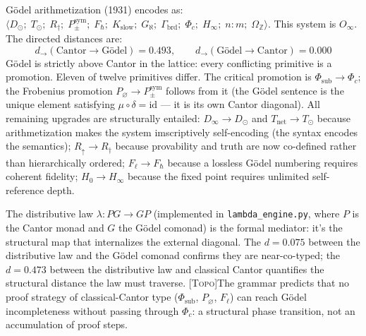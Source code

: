 \documentclass[12pt,a4paper]{article}
\newcommand{\Phic}{\Phi_c}
\newcommand{\Ppms}{P_{\pm}^{\text{sym}}}
\newcommand{\Oinf}{O_\infty}
\newcommand{\OmegaZ}{\Omega_{\mathbb{Z}}}
\newcommand{\TOPO}{\textsc{[Topo]}}
\begin{document}
G\"{o}del arithmetization (1931) encodes as:
$\langle D_\odot;\; T_\odot;\; R_\dagger;\; \Ppms;\; F_\hbar;\;
K_\text{slow};\; G_\aleph;\; \Gamma_\text{brd};\; \Phic;\; H_\infty;\; n{:}m;\;
\OmegaZ \rangle$.
This system is $\Oinf$. The directed distances are:
\begin{equation}
  d_\to(\text{Cantor} \to \text{G\"{o}del}) = 0.493, \qquad
  d_\to(\text{G\"{o}del} \to \text{Cantor}) = 0.000
  \label{eq:cantor_godel_dist}
\end{equation}
G\"{o}del is strictly above Cantor in the lattice: every conflicting
primitive is a promotion. Eleven of twelve primitives differ. The
critical promotion is $\Phi_\text{sub} \to \Phic$; the Frobenius
promotion $P_\varnothing \to \Ppms$ follows from it (the G\"{o}del
sentence is the unique element satisfying $\mu \circ \delta = \text{id}$
--- it is its own Cantor diagonal). All remaining upgrades are
structurally entailed: $D_\infty \to D_\odot$ and $T_\text{net} \to T_\odot$
because arithmetization makes the system imscriptively self-encoding
(the syntax encodes the semantics); $R_\uparrow \to R_\dagger$ because
provability and truth are now co-defined rather than hierarchically ordered;
$F_\ell \to F_\hbar$ because a lossless G\"{o}del numbering requires
coherent fidelity; $H_0 \to H_\infty$ because the fixed point requires
unlimited self-reference depth.

The distributive law $\lambda: PG \to GP$ (implemented in
\texttt{lambda\_engine.py}, where $P$ is the Cantor monad and $G$ the
G\"{o}del comonad) is the formal mediator: it's the structural map
that internalizes the external diagonal. The $d = 0.075$ between the
distributive law and the G\"{o}del comonad confirms they are
near-co-typed; the $d = 0.473$ between the distributive law and classical
Cantor quantifies the structural distance the law must traverse.
\TOPO\quad The grammar predicts that no proof strategy of classical-Cantor
type ($\Phi_\text{sub}$, $P_\varnothing$, $F_\ell$) can reach G\"{o}del
incompleteness without passing through $\Phic$: a structural phase
transition, not an accumulation of proof steps.
\end{document}
